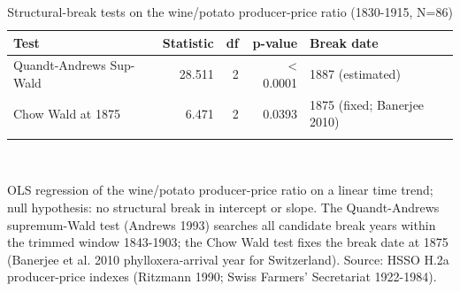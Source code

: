 \begin{table}[tbp] \centering
{}

\caption{Structural-break tests on the wine/potato producer-price ratio (1830-1915, N=86)}
\label{tab:t27_struct_break}
\begin{tabularx}{\linewidth}{lrrrl}

\toprule
{Test}&{Statistic}&{df}&{p-value}&{Break date} \tabularnewline
\midrule \addlinespace[\belowrulesep]
Quandt-Andrews Sup-Wald&28.511&2&< 0.0001&1887 (estimated) \tabularnewline
Chow Wald at 1875&6.471&2&0.0393&1875 (fixed; Banerjee 2010) \tabularnewline
\bottomrule \addlinespace[\belowrulesep]

\end{tabularx}
\\ \parbox{\linewidth}{\footnotesize OLS regression of the wine/potato producer-price ratio on a linear time trend; null hypothesis: no structural break in intercept or slope. The Quandt-Andrews supremum-Wald test (Andrews 1993) searches all candidate break years within the trimmed window 1843-1903; the Chow Wald test fixes the break date at 1875 (Banerjee et al. 2010 phylloxera-arrival year for Switzerland). Source: HSSO H.2a producer-price indexes (Ritzmann 1990; Swiss Farmers' Secretariat 1922-1984).}
\end{table}
